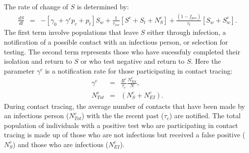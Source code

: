 \documentclass[notitlepage, superscriptaddress]{revtex4-2}
\begin{document}
The rate of change of $S$ is determined by:
\begin{eqnarray}
\label{E:dS}
\frac{dS}{dt} &=& - [\gamma_{0}  + \gamma^{c} p_{c} +p_{t}] S_{w} + \frac{1}{\tau_{iso}}[S^{c} + S_{t} + N^{c}_{S}] + \frac{(1-f_{pos})}{\tau_{t}}[S_{w} + S^{c}_{w}].
\end{eqnarray}
The first term involve populations that leave $S$ either through infection, a notification of a possible contact with an infectious person, or selection for testing. The second term represents those who have sucessfuly completed their isolation and return to $S$ or who test negative and return to $S$. Here the parameter $\gamma^{c}$ is a notification rate for those participating in contact tracing:
\begin{eqnarray}
\label{E:notificationrate}
\gamma^{c} &=& \frac{R^{c}}{\tau_{c}} \frac{N^{c}_{Tot} }{N}, \\
N^{c}_{Tot} &=& (N^{c}_{S} + N^{c}_{EI}).
\end{eqnarray}
During contact tracing, the average number of contacts that have been made by an infectious person ($N^{c}_{Tot}$) with the the recent past ($\tau_{c}$) are notified. The total population of individuals with a positive test who are participating in contact tracing is made up of those who are not infectious but received a false positive ($N^{c}_{S}$) and those who are infectious ($N^{c}_{EI}$). 
\end{document}
